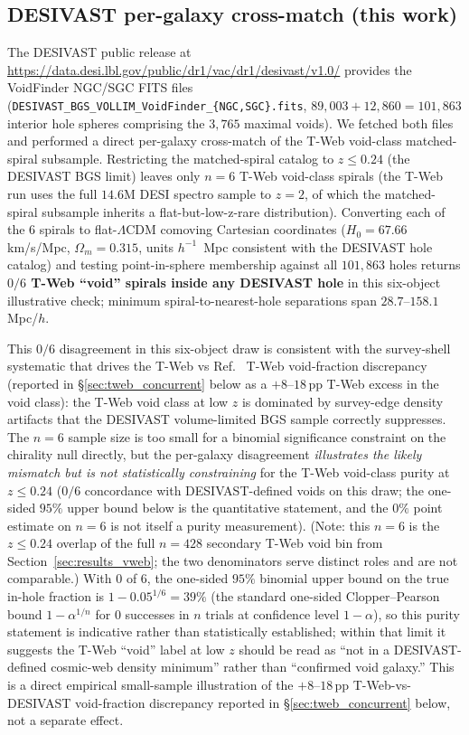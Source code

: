 \documentclass[twocolumn,linenumbers]{aastex702}
\begin{document}
\fi
\subsection{DESIVAST per-galaxy cross-match (this work)}\label{sec:desivast_xmatch}

The DESIVAST
public release at
\url{https://data.desi.lbl.gov/public/dr1/vac/dr1/desivast/v1.0/}
provides the VoidFinder NGC/SGC FITS files
(\nolinkurl{DESIVAST_BGS_VOLLIM_VoidFinder_\{NGC,SGC\}.fits},
$89{,}003 + 12{,}860 = 101{,}863$ interior hole spheres comprising the
$3{,}765$ maximal voids). We fetched both files and performed a direct
per-galaxy cross-match of the T-Web void-class matched-spiral
subsample. Restricting the matched-spiral catalog to $z \leq 0.24$
(the DESIVAST BGS limit) leaves only $n = 6$ T-Web void-class spirals
(the T-Web run uses the full $14.6$M DESI spectro sample to $z = 2$,
of which the matched-spiral subsample inherits a flat-but-low-z-rare
distribution). Converting each of the 6 spirals to flat-$\Lambda$CDM
comoving Cartesian coordinates ($H_0 = 67.66$ km/s/Mpc, $\Omega_m =
0.315$, units $h^{-1}$~Mpc consistent with the DESIVAST hole catalog)
and testing point-in-sphere membership against all $101{,}863$ holes
returns \textbf{$0/6$ T-Web ``void'' spirals inside any DESIVAST hole}
in this six-object illustrative check;
minimum spiral-to-nearest-hole separations span $28.7$--$158.1\,$Mpc/$h$.

This $0/6$ disagreement in this six-object draw is consistent with the survey-shell systematic
that drives the T-Web vs Ref.~\cite{TWebDESI2026} T-Web void-fraction discrepancy
(reported in \S\ref{sec:tweb_concurrent} below as a
$+8$--$18\,$pp T-Web excess in the void class):
the T-Web void class at low $z$ is dominated by
survey-edge density artifacts that the DESIVAST volume-limited BGS
sample correctly suppresses. The $n = 6$ sample size is too small for
a binomial significance constraint on the chirality null directly, but
the per-galaxy disagreement \emph{illustrates the likely mismatch but is
not statistically constraining} for the T-Web void-class purity at
$z \leq 0.24$ ($0/6$ concordance with DESIVAST-defined voids on this
draw; the one-sided $95\%$ upper bound below is the quantitative
statement, and the $0\%$ point estimate on $n=6$ is not itself a purity
measurement). (Note: this $n=6$ is the $z \leq 0.24$ overlap of the full
$n=428$ secondary T-Web void bin from
Section~\ref{sec:results_vweb}; the two denominators serve distinct
roles and are not comparable.) With $0$ of $6$, the one-sided $95\%$ binomial upper bound on
the true in-hole fraction is $1 - 0.05^{1/6} = 39\%$ (the standard
one-sided Clopper--Pearson bound $1 - \alpha^{1/n}$ for $0$ successes in
$n$ trials at confidence level $1-\alpha$), so this purity
statement is indicative rather than statistically established;
within that limit it suggests the T-Web ``void'' label at low $z$
should be read as ``not in a DESIVAST-defined cosmic-web density
minimum'' rather than ``confirmed void galaxy.''
This is a direct empirical small-sample illustration of the
$+8$--$18\,$pp T-Web-vs-DESIVAST void-fraction discrepancy
reported in \S\ref{sec:tweb_concurrent} below,
not a separate effect.
\end{document}
